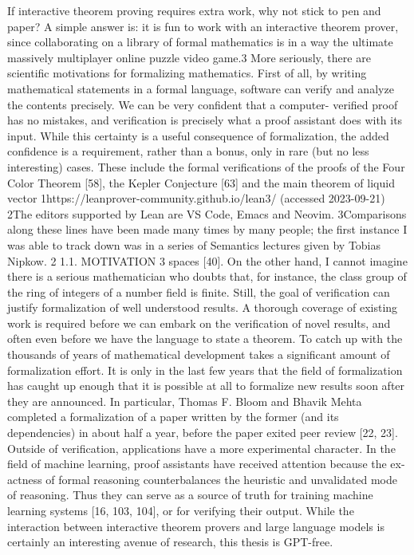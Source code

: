 \documentclass{book}
\theoremstyle{definition}
\begin{document}
If interactive theorem proving requires extra work, why not stick to pen and paper? A simple answer is: it is fun to work with an interactive theorem prover, since collaborating on a library of formal mathematics is in a way the ultimate massively multiplayer online puzzle video game.3
More seriously, there are scientific motivations for formalizing mathematics. First of all, by writing mathematical statements in a formal language, software can verify and analyze the contents precisely. We can be very confident that a computer- verified proof has no mistakes, and verification is precisely what a proof assistant does with its input. While this certainty is a useful consequence of formalization, the added confidence is a requirement, rather than a bonus, only in rare (but no less interesting) cases. These include the formal verifications of the proofs of the Four Color Theorem [58], the Kepler Conjecture [63] and the main theorem of liquid vector
 1https://leanprover-community.github.io/lean3/ (accessed 2023-09-21)
2The editors supported by Lean are VS Code, Emacs and Neovim.
3Comparisons along these lines have been made many times by many people; the first instance I was
 able to track down was in a series of Semantics lectures given by Tobias Nipkow. 2
1.1. MOTIVATION   3
spaces [40]. On the other hand, I cannot imagine there is a serious mathematician who doubts that, for instance, the class group of the ring of integers of a number field is finite.
Still, the goal of verification can justify formalization of well understood results. A thorough coverage of existing work is required before we can embark on the verification of novel results, and often even before we have the language to state a theorem. To catch up with the thousands of years of mathematical development takes a significant amount of formalization effort. It is only in the last few years that the field of formalization has caught up enough that it is possible at all to formalize new results soon after they are announced. In particular, Thomas F. Bloom and Bhavik Mehta completed a formalization of a paper written by the former (and its dependencies) in about half a year, before the paper exited peer review [22, 23].
Outside of verification, applications have a more experimental character. In the field of machine learning, proof assistants have received attention because the ex- actness of formal reasoning counterbalances the heuristic and unvalidated mode of reasoning. Thus they can serve as a source of truth for training machine learning systems [16, 103, 104], or for verifying their output. While the interaction between interactive theorem provers and large language models is certainly an interesting avenue of research, this thesis is GPT-free.
\end{document}
